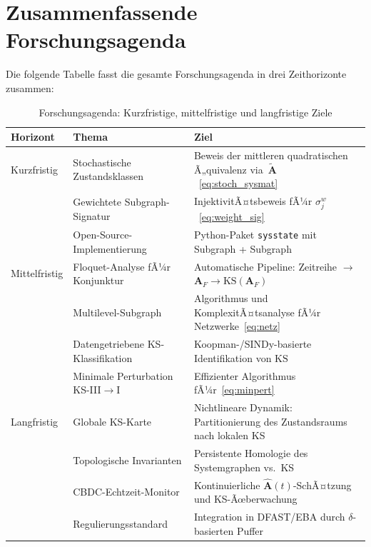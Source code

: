 ﻿\documentclass[12pt, a4paper, titlepage]{report}
\theoremstyle{definition}
\theoremstyle{remark}
\newcommand{\vA}{\bm{A}}
\newcommand{\KS}{\mathrm{KS}}
\begin{document}
\section{Zusammenfassende Forschungsagenda}
\label{subsec:agenda}

Die folgende Tabelle fasst die gesamte Forschungsagenda in drei Zeithorizonte
zusammen:

\begin{table}[H]
\centering
\caption{Forschungsagenda: Kurzfristige, mittelfristige und langfristige Ziele}
\label{tab:agenda}
\begin{tabular}{>{\raggedright\arraybackslash}p{2.2cm}
                >{\raggedright\arraybackslash}p{5.0cm}
                >{\raggedright\arraybackslash}p{5.0cm}}
\toprule
\textbf{Horizont} & \textbf{Thema} & \textbf{Ziel} \\
\midrule
Kurzfristig & Stochastische Zustandsklassen & Beweis der mittleren quadratischen
  Ã„quivalenz via~$\tilde{\vA}$~\eqref{eq:stoch_sysmat} \\
 & Gewichtete Subgraph-Signatur & InjektivitÃ¤tsbeweis fÃ¼r $\sigma_j^w$~\eqref{eq:weight_sig} \\
 & Open-Source-Implementierung & Python-Paket \texttt{sysstate} mit Subgraph + Subgraph \\
\midrule
Mittelfristig & Floquet-Analyse fÃ¼r Konjunktur & Automatische Pipeline: Zeitreihe $\to$
  $\vA_F \to \KS(\vA_F)$ \\
 & Multilevel-Subgraph & Algorithmus und KomplexitÃ¤tsanalyse fÃ¼r Netzwerke~\eqref{eq:netz} \\
 & Datengetriebene KS-Klassifikation & Koopman-/SINDy-basierte Identifikation von $\KS$ \\
 & Minimale Perturbation KS-III$\to$I & Effizienter Algorithmus fÃ¼r~\eqref{eq:minpert} \\
\midrule
Langfristig & Globale KS-Karte & Nichtlineare Dynamik: Partitionierung des
  Zustandsraums nach lokalen KS \\
 & Topologische Invarianten & Persistente Homologie des Systemgraphen vs.\ KS \\
 & CBDC-Echtzeit-Monitor & Kontinuierliche $\hat{\vA}(t)$-SchÃ¤tzung und KS-Ãœberwachung \\
 & Regulierungsstandard & Integration in DFAST/EBA durch $\delta$-basierten Puffer \\
\bottomrule
\end{tabular}
\end{table}
\end{document}

